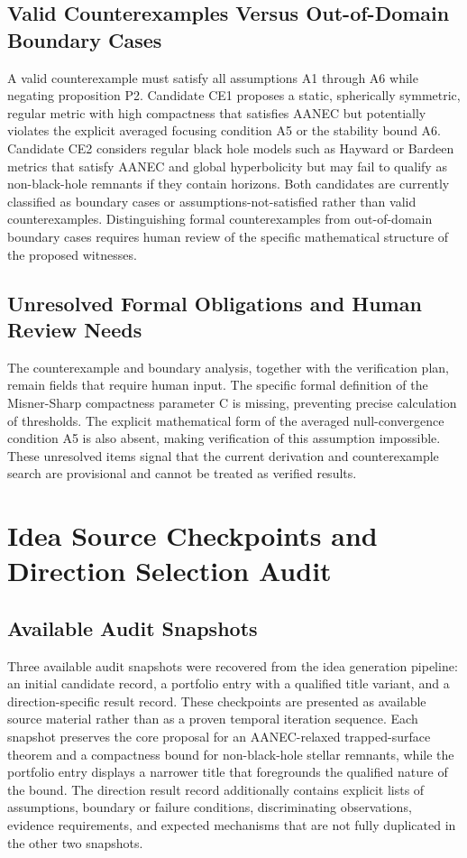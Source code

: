 \documentclass[conference]{IEEEtran}
\begin{document}
\subsection{Valid Counterexamples Versus Out-of-Domain Boundary Cases}
A valid counterexample must satisfy all assumptions A1 through A6 while negating proposition P2. Candidate CE1 proposes a static, spherically symmetric, regular metric with high compactness that satisfies AANEC but potentially violates the explicit averaged focusing condition A5 or the stability bound A6. Candidate CE2 considers regular black hole models such as Hayward or Bardeen metrics that satisfy AANEC and global hyperbolicity but may fail to qualify as non-black-hole remnants if they contain horizons. Both candidates are currently classified as boundary cases or assumptions-not-satisfied rather than valid counterexamples. Distinguishing formal counterexamples from out-of-domain boundary cases requires human review of the specific mathematical structure of the proposed witnesses.

\subsection{Unresolved Formal Obligations and Human Review Needs}
The counterexample and boundary analysis, together with the verification plan, remain fields that require human input. The specific formal definition of the Misner-Sharp compactness parameter C is missing, preventing precise calculation of thresholds. The explicit mathematical form of the averaged null-convergence condition A5 is also absent, making verification of this assumption impossible. These unresolved items signal that the current derivation and counterexample search are provisional and cannot be treated as verified results.

\appendices
\section{Idea Source Checkpoints and Direction Selection Audit}
\subsection{Available Audit Snapshots}
Three available audit snapshots were recovered from the idea generation pipeline: an initial candidate record, a portfolio entry with a qualified title variant, and a direction-specific result record. These checkpoints are presented as available source material rather than as a proven temporal iteration sequence. Each snapshot preserves the core proposal for an AANEC-relaxed trapped-surface theorem and a compactness bound for non-black-hole stellar remnants, while the portfolio entry displays a narrower title that foregrounds the qualified nature of the bound. The direction result record additionally contains explicit lists of assumptions, boundary or failure conditions, discriminating observations, evidence requirements, and expected mechanisms that are not fully duplicated in the other two snapshots.
\end{document}
